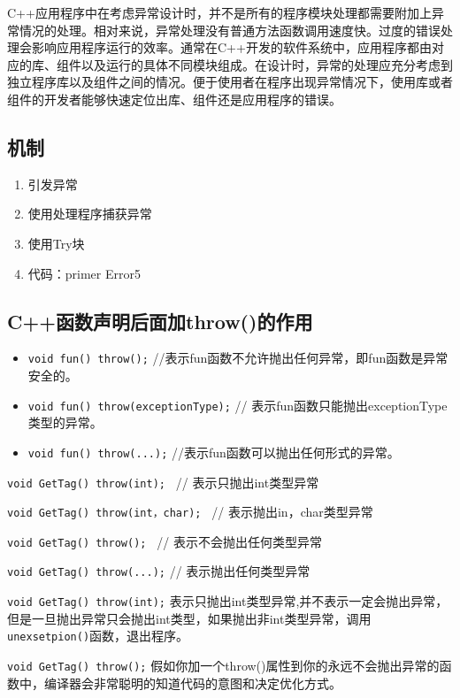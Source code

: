 \documentclass[UTF8,a4paper,12pt]{ctexbook} %
\begin{document}
		C++应用程序中在考虑异常设计时，并不是所有的程序模块处理都需要附加上异常情况的处理。相对来说，异常处理没有普通方法函数调用速度快。过度的错误处理会影响应用程序运行的效率。通常在C++开发的软件系统中，应用程序都由对应的库、组件以及运行的具体不同模块组成。在设计时，异常的处理应充分考虑到独立程序库以及组件之间的情况。便于使用者在程序出现异常情况下，使用库或者组件的开发者能够快速定位出库、组件还是应用程序的错误。
		
		\subsection{机制}
			\begin{enumerate}
				\item 引发异常
				\item 使用处理程序捕获异常
				\item 使用Try块
				\item 代码：primer Error5
			\end{enumerate}
		
		\subsection{C++函数声明后面加throw()的作用}
			\begin{itemize}
				\item \verb|void fun() throw();|      //表示fun函数不允许抛出任何异常，即fun函数是异常安全的。
				\item \verb|void fun() throw(exceptionType);|    // 表示fun函数只能抛出exceptionType类型的异常。
				\item \verb|void fun() throw(...);|    //表示fun函数可以抛出任何形式的异常。
			\end{itemize}	
			
			\verb|void GetTag() throw(int); |                    // 表示只抛出int类型异常
			
			\verb|void GetTag() throw(int，char); |        // 表示抛出in，char类型异常
			
			\verb|void GetTag() throw(); |                        // 表示不会抛出任何类型异常
			
			\verb|void GetTag() throw(...);|                      // 表示抛出任何类型异常
			
			\verb|void GetTag() throw(int);| 表示只抛出int类型异常,并不表示一定会抛出异常，但是一旦抛出异常只会抛出int类型，如果抛出非int类型异常，调用\verb|unexsetpion()|函数，退出程序。
			
			\verb|void GetTag() throw();|  假如你加一个throw()属性到你的永远不会抛出异常的函数中，编译器会非常聪明的知道代码的意图和决定优化方式。
			
\end{document}
